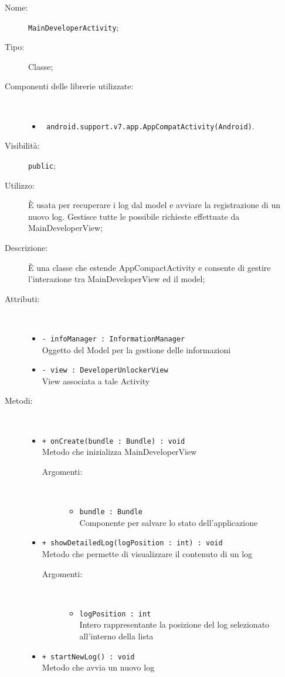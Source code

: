 \documentclass[../DefinizioneDiProdotto.tex]{subfiles}
\begin{document}
    \begin{description}
\item[Nome:] \texttt{MainDeveloperActivity};
\item[Tipo:] Classe;
\item[Componenti delle librerie utilizzate:] \
\begin{itemize}
\item \texttt{ android.support.v7.app.AppCompatActivity(Android)}.

\end{itemize}
\item[Visibilità:] \texttt{public};
\item[Utilizzo:] È usata per recuperare i log dal model e avviare la registrazione di un nuovo log. Gestisce tutte le possibile richieste effettuate da MainDeveloperView;
\item[Descrizione:] È una classe che estende AppCompactActivity e consente di gestire l'interazione tra MainDeveloperView ed il model;
\item[Attributi:] \
\begin{itemize}
\item \texttt{- infoManager : InformationManager}\\
Oggetto del Model per la gestione delle informazioni

\item \texttt{- view : DeveloperUnlockerView}\\
View associata a tale Activity

\end{itemize}
\item[Metodi:] \
\begin{itemize}
\item \texttt{+ onCreate(bundle : Bundle) : void}\\
Metodo che inizializza MainDeveloperView
 \begin{description}
\item[Argomenti:] \
\begin{itemize}
\item \texttt{bundle : Bundle}\\
Componente per salvare lo stato dell'applicazione\end{itemize}
\end{description}
\item \texttt{+ showDetailedLog(logPosition  : int) : void}\\
Metodo che permette di visualizzare il contenuto di un log
 \begin{description}
\item[Argomenti:] \
\begin{itemize}
\item \texttt{logPosition  : int}\\
Intero rappresentante la posizione del log selezionato all'interno della lista\end{itemize}
\end{description}
\item \texttt{+ startNewLog() : void}\\
Metodo che avvia un nuovo log
 \end{itemize}
\end{description}
\end{document}
